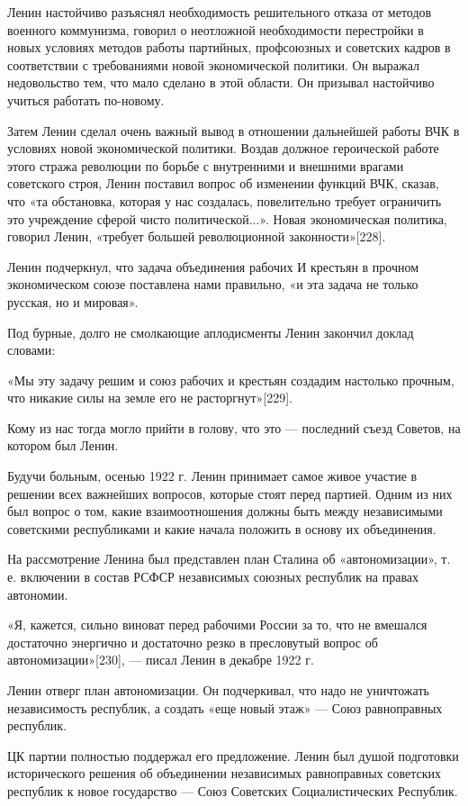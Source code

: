 \documentclass[12pt, a4paper, openany]{book}
\begin{document}
Ленин настойчиво разъяснял необходимость решительного отказа от методов военного коммунизма, говорил о неотложной необходимости перестройки в новых условиях методов работы партийных, профсоюзных и советских кадров в соответствии с требованиями новой экономической политики. Он выражал недовольство тем, что мало сделано в этой области. Он призывал настойчиво учиться работать по-новому.

Затем Ленин сделал очень важный вывод в отношении дальнейшей работы ВЧК в условиях новой экономической политики. Воздав должное героической работе этого стража революции по борьбе с внутренними и внешними врагами советского строя, Ленин поставил вопрос об изменении функций ВЧК, сказав, что «та обстановка, которая у нас создалась, повелительно требует ограничить это учреждение сферой чисто политической...». Новая экономическая политика, говорил Ленин, «требует большей революционной законности»[228].

Ленин подчеркнул, что задача объединения рабочих И крестьян в прочном экономическом союзе поставлена нами правильно, «и эта задача не только русская, но и мировая».

Под бурные, долго не смолкающие аплодисменты Ленин закончил доклад словами:

«Мы эту задачу решим и союз рабочих и крестьян создадим настолько прочным, что никакие силы на земле его не расторгнут»[229].

Кому из нас тогда могло прийти в голову, что это — последний съезд Советов, на котором был Ленин.

Будучи больным, осенью 1922 г. Ленин принимает самое живое участие в решении всех важнейших вопросов, которые стоят перед партией. Одним из них был вопрос о том, какие взаимоотношения должны быть между независимыми советскими республиками и какие начала положить в основу их объединения.

На рассмотрение Ленина был представлен план Сталина об «автономизации», т. е. включении в состав РСФСР независимых союзных республик на правах автономии.

«Я, кажется, сильно виноват перед рабочими России за то, что не вмешался достаточно энергично и достаточно резко в пресловутый вопрос об автономизации»[230], — писал Ленин в декабре 1922 г.

Ленин отверг план автономизации. Он подчеркивал, что надо не уничтожать независимость республик, а создать «еще новый этаж» — Союз равноправных республик.

ЦК партии полностью поддержал его предложение. Ленин был душой подготовки исторического решения об объединении независимых равноправных советских республик к новое государство — Союз Советских Социалистических Республик.
\end{document}
